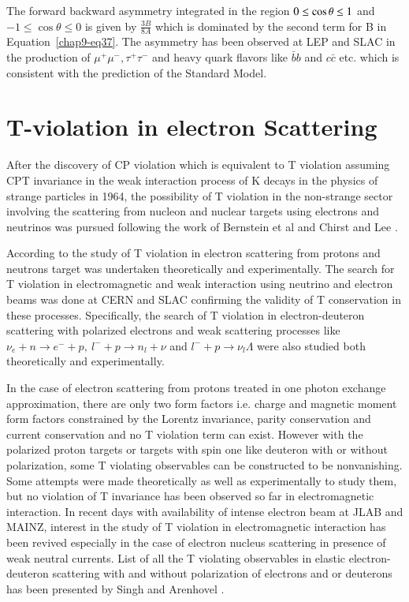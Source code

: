  The forward backward asymmetry integrated in the region $0\leq\break \cos\theta\leq 1$   and $-1\leq\cos\theta\leq 0$ is given by $\frac{3B}{8A}$ which is dominated by the second term for B in Equation~\ref{chap9-eq37}. The asymmetry has been observed at LEP and SLAC in the production of $\mu^+\mu^-,\tau^+\tau^-$ and heavy quark flavors like $\bar{b}b$ and $c\bar{c}$ etc. which is consistent with the prediction of the Standard Model. 
 
\section{T-violation in electron Scattering}\label{chap9-sec4}

After the discovery of CP violation which is equivalent to T violation assuming CPT invariance in the weak interaction process of K decays in the physics of strange particles in 1964, the possibility of T violation in the non-strange sector involving the scattering from nucleon and nuclear targets using electrons and neutrinos was pursued following the work of Bernstein et al \cite{chap9-key31} and Chirst and Lee \cite{chap9-key32}.

According to the study of T violation in electron scattering from protons and neutrons target was undertaken theoretically and experimentally. The search for T violation in electromagnetic and weak interaction using neutrino and  electron beams was done at CERN and SLAC confirming the validity of  T conservation in these processes. Specifically, the search of T violation in electron-deuteron scattering with polarized electrons and weak scattering processes like $\nu_e+n\rightarrow e^-+p, ~ l^-+p\rightarrow n_l+\nu$ and $ l^-+p\rightarrow \nu_l \Lambda$ were also studied both theoretically and experimentally. 

In the case of electron scattering from protons treated in one photon exchange approximation, there are only two form factors i.e. charge and magnetic moment form factors constrained by the Lorentz invariance, parity conservation and current conservation and no T violation term can exist. However with the polarized proton targets or targets with spin one like deuteron with or without polarization, some T violating observables can be constructed to be nonvanishing. Some attempts were made theoretically as well as experimentally  to study them, but no violation of T invariance has been observed so far in electromagnetic interaction. In recent days with availability of intense electron beam at JLAB and MAINZ, interest in the study of T violation in electromagnetic interaction has been revived especially in the case of electron nucleus scattering in presence of weak neutral currents. List of all the T violating observables in elastic electron-deuteron scattering with and without polarization of electrons and or deuterons has been presented by Singh and Arenhovel \cite{chap9-key11}.

